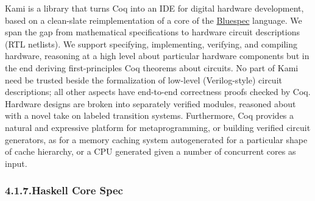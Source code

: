 \documentclass[12pt,twoside]{article}
\begin{document}
\noindent{}Kami is a library that turns Coq into an IDE for digital hardware
development, based on a clean-slate reimplementation of a core of the
\href{http://www.bluespec.com}{Bluespec} language. We span the gap from mathematical specifications to
hardware circuit descriptions (RTL netlists). We support specifying,
implementing, verifying, and compiling hardware, reasoning at a high
level about particular hardware components but in the end deriving
first-principles Coq theorems about circuits. No part of Kami need be
trusted beside the formalization of low-level (Verilog-style) circuit
descriptions; all other aspects have end-to-end correctness proofs
checked by Coq. Hardware designs are broken into separately verified
modules, reasoned about with a novel take on labeled transition
systems. Furthermore, Coq provides a natural and expressive platform
for metaprogramming, or building verified circuit generators, as for a
memory caching system autogenerated for a particular shape of cache
hierarchy, or a CPU generated given a number of concurrent cores as
input.%

\subsubsection{4.1.7.\hspace*{0.5em}Haskell Core Spec}%
\end{document}

